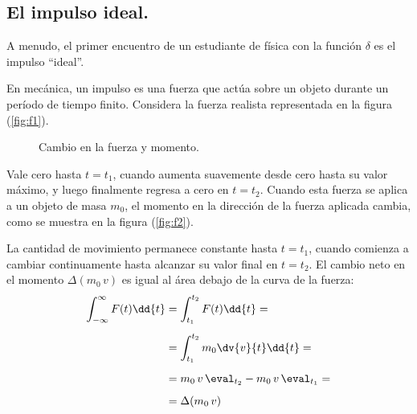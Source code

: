 \subsection{El impulso ideal.}

A menudo, el primer encuentro de un estudiante de física con la función $\delta$ es el impulso \enquote{ideal}.
\par
En mecánica, un impulso es una fuerza que actúa sobre un objeto durante un período de tiempo finito. Considera la fuerza realista representada en la figura (\ref{fig:f1}).

\begin{figure}[H]
\centering
{}
\caption{Cambio en la fuerza y momento.}
\end{figure}

Vale cero hasta $t = t_{1}$, cuando aumenta suavemente desde cero hasta su valor máximo, y luego finalmente regresa a cero en $t = t_{2}$. Cuando esta fuerza se aplica a un objeto de masa $m_{0}$, el momento en la dirección de la fuerza aplicada cambia, como se muestra en la figura (\ref{fig:f2}).
\par
La cantidad de movimiento permanece constante hasta $t = t_{1}$, cuando comienza a cambiar continuamente hasta alcanzar su valor final en $t = t_{2}$. El cambio neto en el momento $\Delta (m_{0} \, v)$ es igual al área debajo de la curva de la fuerza:
\begin{align}
\begin{aligned}
\int_{-\infty}^{\infty} F(t) \dd{t} &= \int_{t_{1}}^{t_{2}} F(t) \dd{t} = \\[0.5em]
&= \int_{t_{1}}^{t_{2}} m_{0} \dv{v}{t} \dd{t} = \\[0.5em]
&= m_{0} \, v \, \eval_{t_{2}} - m_{0} \, v \, \eval_{t_{1}} = \\[0.5em]
&= \Delta (m_{0} \, v) 
\end{aligned}
\label{eq:ecuacion_05_01}
\end{align}

